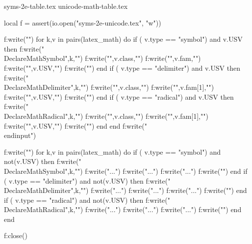 \documentclass{article}
\begin{document}
\let\@@let\let
\def\ReadLet#1=#2{%
  \directlua{
    syn  = \luastring{\unexpanded{#1}}
    slot = \luastring{\unexpanded{#2}}
    latex_math[syn] = latex_math[slot]
    latex_math[syn]["copy-of"] = slot
    latex_math[slot]["synonym"] = syn
  }
}



\begingroup

\let\DeclareMathSymbol\ReadDeclareMathSymbol
\let\DeclareMathDelimiter\ReadDeclareMathDelimiter
\let\DeclareMathAccent\ReadDeclareMathAccent
\let\DeclareMathRadical\ReadDeclareMathRadical
\let\def\ReadDef
\let\UnicodeMathSymbol\ReadUnicodeMath
\let\let\ReadLet
\@@input syms-2e-table.tex\relax
\@@input unicode-math-table.tex\relax
\endgroup

\begin{luacode*}
local f = assert(io.open("syms-2e-unicode.tex", "w"))

f:write("\n")
for k,v in pairs(latex_math) do
  if ( v.type == "symbol") and v.USV then
    f:write("\\DeclareMathSymbol{",k,"}")
    f:write("{",v.class,"}")
    f:write("{",v.fam,"}")
    f:write("{",v.USV,"}")
    f:write("\n")
  end
  if ( v.type == "delimiter") and v.USV then
    f:write("\\DeclareMathDelimiter{",k,"}")
    f:write("{",v.class,"}")
    f:write("{",v.fam[1],"}")
    f:write("{",v.USV,"}")
    f:write("\n")
  end
  if ( v.type == "radical") and v.USV then
    f:write("\\DeclareMathRadical{",k,"}")
    f:write("{",v.class,"}")
    f:write("{",v.fam[1],"}")
    f:write("{",v.USV,"}")
    f:write("\n")
  end
end
f:write("\n\\endinput\n")

f:write("\n")
for k,v in pairs(latex_math) do
  if ( v.type == "symbol") and not(v.USV) then
    f:write("\\DeclareMathSymbol{",k,"}")
    f:write("{...}")
    f:write("{...}")
    f:write("{...}")
    f:write("\n")
  end
  if ( v.type == "delimiter") and not(v.USV) then
    f:write("\\DeclareMathDelimiter{",k,"}")
    f:write("{...}")
    f:write("{...}")
    f:write("{...}")
    f:write("\n")
  end
  if ( v.type == "radical") and not(v.USV) then
    f:write("\\DeclareMathRadical{",k,"}")
    f:write("{...}")
    f:write("{...}")
    f:write("{...}")
    f:write("\n")
  end
end

f:close()
\end{luacode*}
\end{document}
